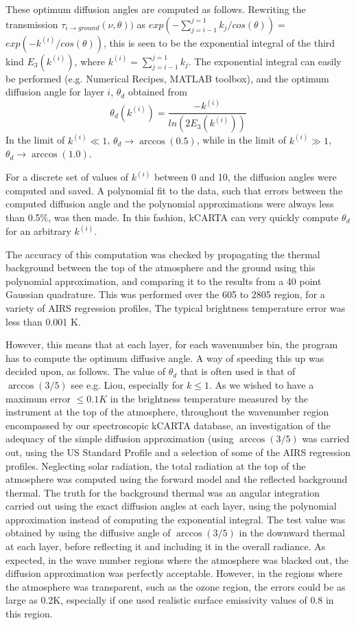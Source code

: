 \documentclass[12pt]{article}
\newcommand{\kc}{\textsf{kCARTA}\xspace}
\begin{document}
{{{{These optimum diffusion angles are computed as follows.
Rewriting the transmission $\tau_{i \rightarrow ground}(\nu,\theta))$ as
$exp(-\sum_{j=i-1}^{j=1}k_{j}/cos(\theta)) = $ \\
$exp(-k^{(i)}/cos(\theta))$, 
this is seen to be the exponential integral of the third kind 
$E_{3}(k^{(i)})$, where $k^{(i)} = \sum_{j=i-1}^{j=1}k_{j}$. 
The exponential integral can easily be performed (e.g. Numerical Recipes, 
{\sf MATLAB} toolbox), and the optimum diffusion 
angle for layer $i$, $\theta_{d}$ obtained from
\begin{equation}
         \theta_{d}(k^{(i)}) = \frac{- k^{(i)}}{ln (2 E_{3}(k^{(i)}))}
\end{equation}
In the limit
of $k^{(i)} \ll 1$, $\theta_{d} \rightarrow \arccos(0.5)$, while in the limit
of $k^{(i)} \gg 1$, $\theta_{d} \rightarrow \arccos(1.0)$. 

For a discrete set of values of $k^{(i)}$ between 0 and 10, the
diffusion angles were computed and saved.  A polynomial fit to the
data, such that errors between the computed diffusion angle and the
polynomial approximations were always less than 0.5\%, was then made.
In this fashion, \kc can very quickly compute $\theta_{d}$ for an
arbitrary $k^{(i)}$.

The accuracy of this computation was checked by propagating the
thermal background between the top of the atmosphere and the ground
using this polynomial approximation, and comparing it to the results
from a 40 point Gaussian quadrature.  This was performed over the 605
to 2805 \wn region, for a variety of AIRS regression profiles, The
typical brightness temperature error was less than 0.001 K.

However, this means that at each layer, for each wavenumber bin, the
program has to compute the optimum diffusive angle.  A way of speeding
this up was decided upon, as follows.  The value of $\theta_{d}$ that
is often used is that of $\arccos (3/5)$ see e.g. Liou, especially for
$k \le 1$. As we wished to have a maximum error $\le 0.1K$ in the
brightness temperature measured by the instrument at the top of the
atmosphere, throughout the wavenumber region encompassed by our
spectroscopic \kc database, an investigation of the adequacy of the
simple diffusion approximation (using $\arccos(3/5)$ was carried out,
using the US Standard Profile and a selection of some of the AIRS
regression profiles.  Neglecting solar radiation, the total radiation
at the top of the atmosphere was computed using the forward model and
the reflected background thermal.  The truth for the background
thermal was an angular integration carried out using the exact
diffusion angles at each layer, using the polynomial approximation
instead of computing the exponential integral.  The test value was
obtained by using the diffusive angle of $\arccos (3/5)$ in the
downward thermal at each layer, before reflecting it and including it
in the overall radiance.  As expected, in the wave number regions where
the atmosphere was blacked out, the diffusion approximation was
perfectly acceptable.  However, in the regions where the atmosphere was
transparent, such as the ozone region, the errors could be as large as
0.2K, especially if one used realistic surface emissivity values of
0.8 in this region.

}}}}
\end{document}

